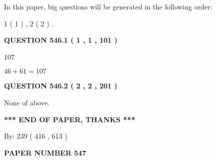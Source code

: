 \documentclass[12pt]{article}
\begin{document}
\vspace{0.2in}
   
In this paper, big questions will be generated in the following order: 
   
   
   1 ( 1 )
 ,
   2 ( 2 )
 .
  
\vspace{0.2in}
  
{\textbf{\Large{QUESTION
546.1 
 ( 1 , 1 , 101 )
}}}
  
  
 
 
\noindent{}

107
 
 
 
 
\noindent{}

$ %
46 +  %
61=   %
107$
 
 
  
\vspace{0.2in}
  
{\textbf{\Large{QUESTION
546.2 
 ( 2 , 2 , 201 )
}}}
  
  
 
 
\noindent{}
 
 
 None of above.
 
 
 
 
   
   
 \vspace{0.2in}
 
   
   
   
   
\vspace{1.0in} 
{\textbf{\large{ *** END OF PAPER, THANKS *** }}} 
   
   
\hspace{1.0in} By: 
 239 ( 416 ,  613 )
   
   
   
   
\newpage 
\setcounter{page}{ 
   547001 } 
   
   
   
   
 {\textbf{ \Large{ PAPER NUMBER  547  }}}
   
   
\vspace{0.2in}
   
   
   
\end{document}
